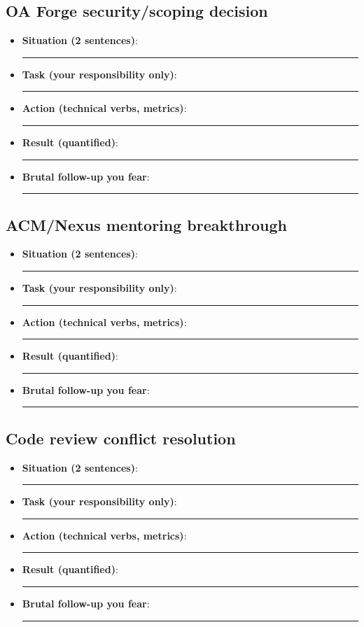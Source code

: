 \documentclass[9pt,a4paper]{article}
\begin{document}
\subsection{OA Forge security/scoping decision}
\begin{itemize}
  \item \textbf{Situation (2 sentences)}: \rule{0.65\textwidth}{0.4pt}
  \item \textbf{Task (your responsibility only)}: \rule{0.65\textwidth}{0.4pt}
  \item \textbf{Action (technical verbs, metrics)}: \rule{0.65\textwidth}{0.4pt}
  \item \textbf{Result (quantified)}: \rule{0.65\textwidth}{0.4pt}
  \item \textbf{Brutal follow-up you fear}: \rule{0.65\textwidth}{0.4pt}
\end{itemize}
\subsection{ACM/Nexus mentoring breakthrough}
\begin{itemize}
  \item \textbf{Situation (2 sentences)}: \rule{0.65\textwidth}{0.4pt}
  \item \textbf{Task (your responsibility only)}: \rule{0.65\textwidth}{0.4pt}
  \item \textbf{Action (technical verbs, metrics)}: \rule{0.65\textwidth}{0.4pt}
  \item \textbf{Result (quantified)}: \rule{0.65\textwidth}{0.4pt}
  \item \textbf{Brutal follow-up you fear}: \rule{0.65\textwidth}{0.4pt}
\end{itemize}
\subsection{Code review conflict resolution}
\begin{itemize}
  \item \textbf{Situation (2 sentences)}: \rule{0.65\textwidth}{0.4pt}
  \item \textbf{Task (your responsibility only)}: \rule{0.65\textwidth}{0.4pt}
  \item \textbf{Action (technical verbs, metrics)}: \rule{0.65\textwidth}{0.4pt}
  \item \textbf{Result (quantified)}: \rule{0.65\textwidth}{0.4pt}
  \item \textbf{Brutal follow-up you fear}: \rule{0.65\textwidth}{0.4pt}
\end{itemize}
\end{document}
